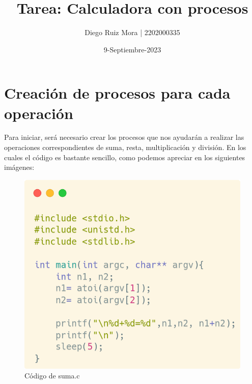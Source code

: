 \documentclass[10pt]{article}
\title{\textbf{Tarea: Calculadora con procesos}}
\author{Diego Ruiz Mora | 2202000335}
\date{9-Septiembre-2023}
\begin{document}
		
	\maketitle
	\section{Creación de procesos para cada operación}
	Para iniciar, será necesario crear los procesos que nos ayudarán a realizar las operaciones correspondientes de suma, resta, multiplicación y división. En los cuales el código es bastante sencillo, como podemos apreciar en los siguientes imágenes:
	
	\begin{figure}[h!]
		\centering
		\includegraphics[width=0.5\linewidth]{suma.png}
		\caption{Código de suma.c}
		\label{fig:suma}
	\end{figure}
	
\end{document}
